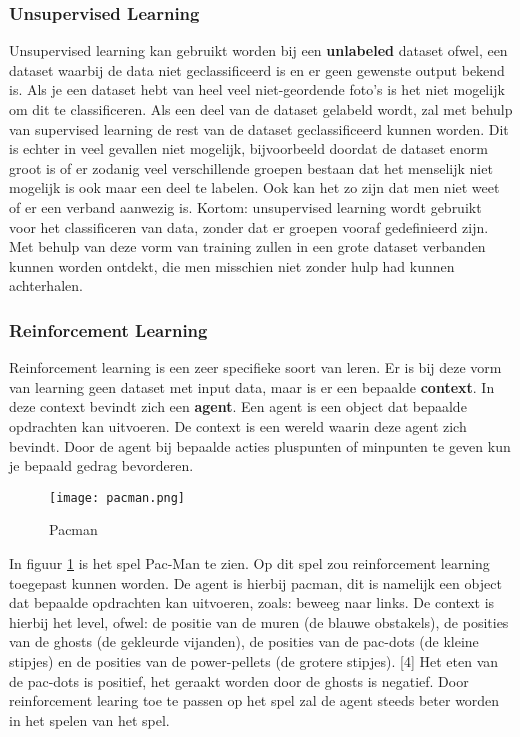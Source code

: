 \subsubsection{Unsupervised Learning}
Unsupervised learning kan gebruikt worden bij een \textbf{unlabeled} dataset ofwel, een dataset waarbij de data niet geclassificeerd is en er geen gewenste output bekend is. Als je een dataset hebt van heel veel niet-geordende foto's is het niet mogelijk om dit te classificeren. Als een deel van de dataset gelabeld wordt, zal met behulp van supervised learning de rest van de dataset geclassificeerd kunnen worden. Dit is echter in veel gevallen niet mogelijk, bijvoorbeeld doordat de dataset enorm groot is of er zodanig veel verschillende groepen bestaan dat het menselijk niet mogelijk is ook maar een deel te labelen. Ook kan het zo zijn dat men niet weet of er een verband aanwezig is. 
Kortom: unsupervised learning wordt gebruikt voor het classificeren van data, zonder dat er groepen vooraf gedefinieerd zijn. Met behulp van deze vorm van training zullen in een grote dataset verbanden kunnen worden ontdekt, die men misschien niet zonder hulp had kunnen achterhalen.\cite{MLCourse2}

\subsubsection{Reinforcement Learning}
Reinforcement learning is een zeer specifieke soort van leren. Er is bij deze vorm van learning geen dataset met input data, maar is er een bepaalde \textbf{context}. In deze context bevindt zich een \textbf{agent}. Een agent is een object dat bepaalde opdrachten kan uitvoeren. De context is een wereld waarin deze agent zich bevindt. Door de agent bij bepaalde acties pluspunten of minpunten te geven kun je bepaald gedrag bevorderen.  

\begin{figure}[h]
  \centering
    \texttt{[image: pacman.png]}
  \caption{Pacman}
  \label{fig:Pacman}
\end{figure}

In figuur \ref{fig:Pacman} is het spel Pac-Man te zien. Op dit spel zou reinforcement learning toegepast kunnen worden. De agent is hierbij pacman, dit is namelijk een object dat bepaalde opdrachten kan uitvoeren, zoals: beweeg naar links. De context is hierbij het level, ofwel: de positie van de muren (de blauwe obstakels), de posities van de ghosts (de gekleurde vijanden), de posities van de pac-dots (de kleine stipjes) en de posities van de power-pellets (de grotere stipjes). [4] Het eten van de pac-dots is positief, het geraakt worden door de ghosts is negatief. Door reinforcement learing toe te passen op het spel zal de agent steeds beter worden in het spelen van het spel. 

